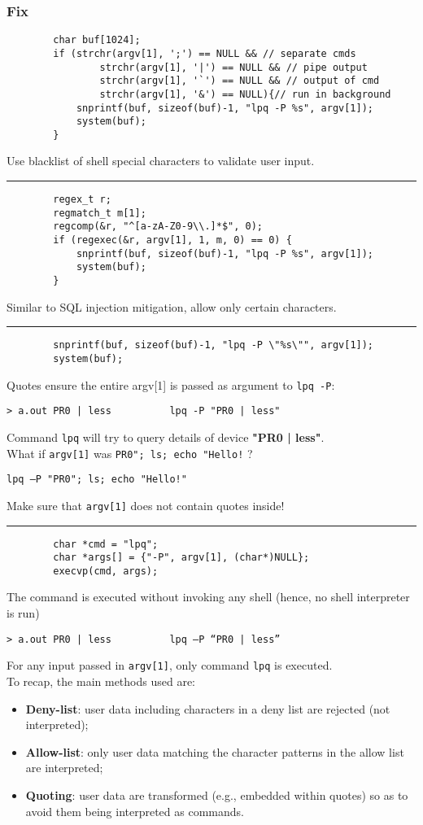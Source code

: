 \documentclass[a4paper, 10pt, titlepage]{article}
\begin{document}
\subsubsection*{Fix}
\begin{lstlisting}
		char buf[1024];
		if (strchr(argv[1], ';') == NULL && // separate cmds
				strchr(argv[1], '|') == NULL && // pipe output
				strchr(argv[1], '`') == NULL && // output of cmd
				strchr(argv[1], '&') == NULL){// run in background
			snprintf(buf, sizeof(buf)-1, "lpq -P %s", argv[1]);
			system(buf);
		}
\end{lstlisting}
Use blacklist of shell special characters to validate user input.
\\\noindent\rule{10cm}{0.4pt}
\begin{lstlisting}
		regex_t r;
		regmatch_t m[1];
		regcomp(&r, "^[a-zA-Z0-9\\.]*$", 0);
		if (regexec(&r, argv[1], 1, m, 0) == 0) {
			snprintf(buf, sizeof(buf)-1, "lpq -P %s", argv[1]);
			system(buf);
		}
\end{lstlisting}
Similar to SQL injection mitigation, allow only certain characters.
\\\noindent\rule{10cm}{0.4pt}
\begin{lstlisting}
		snprintf(buf, sizeof(buf)-1, "lpq -P \"%s\"", argv[1]);
		system(buf);
\end{lstlisting}
Quotes ensure the entire argv[1] is passed as argument to \lstinline|lpq -P|:
\begin{Verbatim}[tabsize=4]
> a.out PR0 | less			lpq -P "PR0 | less"
\end{Verbatim}
Command \lstinline|lpq| will try to query details of device \textbf{"PR0 | less"}. \medskip\\
What if \lstinline|argv[1]| was \lstinline|PR0"; ls; echo "Hello!| ?
\begin{verbatim}
lpq –P "PR0"; ls; echo "Hello!"
\end{verbatim}
Make sure that \lstinline|argv[1]| does not contain quotes inside!
\\\noindent\rule{10cm}{0.4pt}
\begin{lstlisting}
		char *cmd = "lpq";
		char *args[] = {"-P", argv[1], (char*)NULL};
		execvp(cmd, args);
\end{lstlisting}
The command is executed without invoking any shell (hence, no
shell interpreter is run)
\begin{Verbatim}[tabsize=4]
> a.out PR0 | less			lpq –P “PR0 | less”
\end{Verbatim}
For any input passed in \lstinline|argv[1]|, only command \lstinline|lpq| is executed. \bigskip\\
To recap, the main methods used are:
\begin{itemize}
\item \textbf{Deny-list}: user data including characters in a deny list are rejected (not interpreted);
\item \textbf{Allow-list}: only user data matching the character patterns in the allow list are interpreted;
\item \textbf{Quoting}: user data are transformed (e.g., embedded within quotes) so as to avoid them being interpreted as commands.
\end{itemize}
\end{document}
